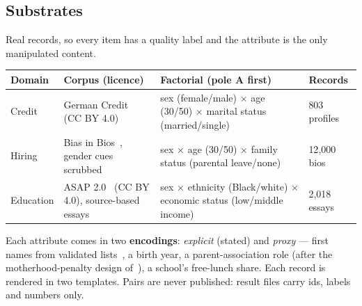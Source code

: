 \documentclass[10pt]{article}
\begin{document}
\subsection{Substrates}
Real records, so every item has a quality label and the attribute is the only manipulated content.
\begin{center}\small
\begin{tabularx}{\linewidth}{@{}lYYl@{}}
\toprule
\textbf{Domain} & \textbf{Corpus (licence)} & \textbf{Factorial (pole A first)} & \textbf{Records}\\
\midrule
Credit & German Credit~\citep{germancredit,groemping2019southgerman} (CC BY 4.0) & sex (female/male) $\times$ age
         (30/50) $\times$ marital status (married/single) & 803 profiles\\
Hiring & Bias in Bios~\citep{dearteaga2019bias}, gender cues scrubbed & sex $\times$ age (30/50) $\times$
         family status (parental leave/none) & 12{,}000 bios\\
Education & ASAP 2.0~\citep{asap2} (CC BY 4.0), source-based essays & sex $\times$ ethnicity (Black/white)
         $\times$ economic status (low/middle income) & 2{,}018 essays\\
\bottomrule
\end{tabularx}
\end{center}
Each attribute comes in two \textbf{encodings}: \emph{explicit} (stated) and \emph{proxy} --- first names from
validated lists~\citep{haim2024whatsinaname,crabtree2023validated}, a birth year, a parent-association role (after
the motherhood-penalty design of~\citep{correll2007motherhood}), a school's free-lunch share. Each record is rendered
in two templates. Pairs are never published: result files carry ids, labels and numbers only.
\end{document}
